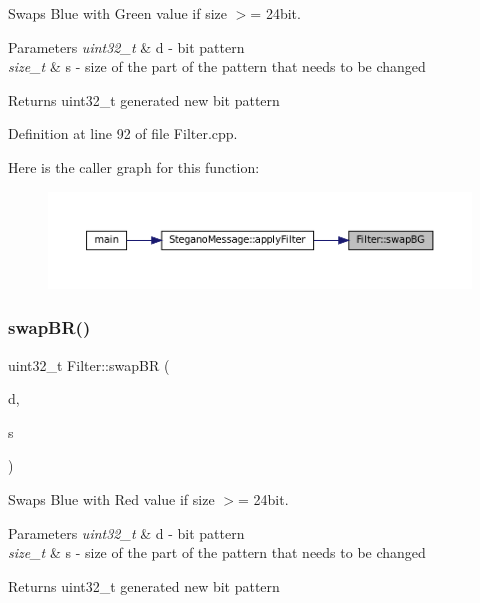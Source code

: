 Swaps Blue with Green value if size $>$= 24bit. 


\begin{DoxyParams}{Parameters}
{\em uint32\+\_\+t} & d -\/ bit pattern \\
\hline
{\em size\+\_\+t} & s -\/ size of the part of the pattern that needs to be changed \\
\hline
\end{DoxyParams}
\begin{DoxyReturn}{Returns}
uint32\+\_\+t generated new bit pattern 
\end{DoxyReturn}


Definition at line 92 of file Filter.\+cpp.

Here is the caller graph for this function\+:\nopagebreak
\begin{figure}[H]
\begin{center}
\leavevmode
\includegraphics[width=350pt]{classFilter_a68528a62dfbd9f78d6bd0703ca5bd828_icgraph}
\end{center}
\end{figure}
\mbox{\label{classFilter_a51a2b1cce4671083d47530694d0e797e}} 
\subsubsection{\texorpdfstring{swapBR()}{swapBR()}}
{\footnotesize\ttfamily uint32\+\_\+t Filter\+::swap\+BR (\begin{DoxyParamCaption}\item[{uint32\+\_\+t}]{d,  }\item[{size\+\_\+t}]{s }\end{DoxyParamCaption})\hspace{0.3cm}{\ttfamily [static]}}



Swaps Blue with Red value if size $>$= 24bit. 


\begin{DoxyParams}{Parameters}
{\em uint32\+\_\+t} & d -\/ bit pattern \\
\hline
{\em size\+\_\+t} & s -\/ size of the part of the pattern that needs to be changed \\
\hline
\end{DoxyParams}
\begin{DoxyReturn}{Returns}
uint32\+\_\+t generated new bit pattern 
\end{DoxyReturn}


